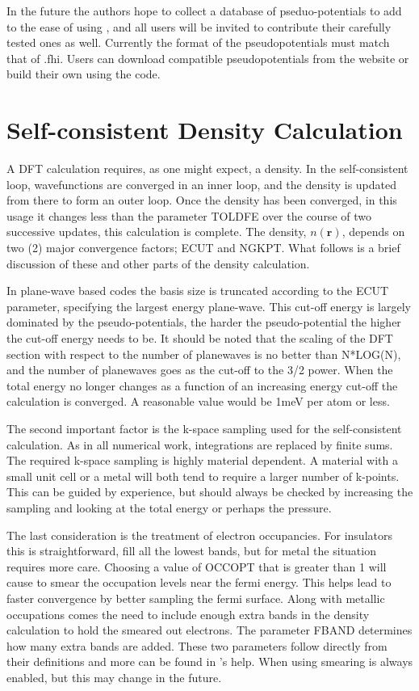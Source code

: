 \documentclass[11pt]{report}
\begin{document}
In the future the authors hope to collect a database of pseduo-potentials to add to the ease of using ,
 and all users will be invited to contribute their carefully tested ones as well. Currently the format of the pseudopotentials must
 match that of  .fhi. Users can download compatible pseudopotentials from the  website \cite{abinit0} or build their own using the  code. 

\section{Self-consistent Density Calculation}
A DFT calculation requires, as one might expect, a density. In the self-consistent loop, wavefunctions are converged in an inner loop, and the density is updated from there to form an outer loop. Once the density has been converged, in this usage it changes less than the parameter TOLDFE over the course of two successive updates, this calculation is complete. The density, $n(\mathbf{r})$, depends on two (2) major convergence factors; ECUT and NGKPT. What follows is a brief discussion of these and other parts of the density calculation.

In plane-wave based codes the basis size is truncated according to the ECUT parameter, specifying the largest energy plane-wave. This cut-off energy is largely dominated by the pseudo-potentials, the harder the pseudo-potential the higher the cut-off energy needs to be. It should be noted that the scaling of the DFT section with respect to the number of planewaves is no better than N*LOG(N), and the number of planewaves goes as the cut-off to the 3/2 power. When the total energy no longer changes as a function of an increasing energy cut-off the calculation is converged. A reasonable value would be 1meV per atom or less.

The second important factor is the k-space sampling used for the self-consistent calculation. As in all numerical work, integrations are replaced by finite sums. The required k-space sampling is highly material dependent. A material with a small unit cell or a metal will both tend to require a larger number of k-points. This can be guided by experience, but should always be checked by increasing the sampling and looking at the total energy or perhaps the pressure. 

The last consideration is the treatment of electron occupancies. For insulators this is straightforward, fill all the lowest bands, but for metal the situation requires more care. Choosing a value of OCCOPT that is greater than 1 will cause  to smear the occupation levels near the fermi energy. This helps lead to faster convergence by better sampling the fermi surface. Along with metallic occupations comes the need to include enough extra bands in the density calculation to hold the smeared out electrons. The parameter FBAND determines how many extra bands are added. These two parameters follow directly from their  definitions and more can be found in 's help. When using  smearing is always enabled, but this may change in the future. 
\end{document}
